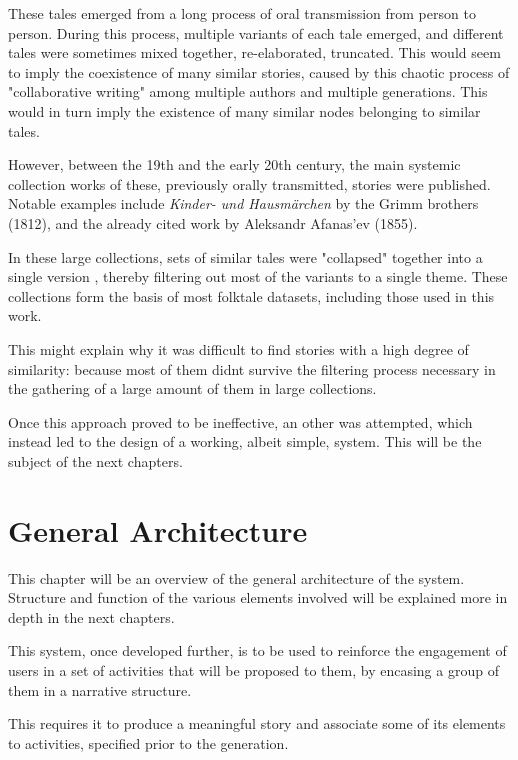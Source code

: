 \documentclass[12pt,a4paper,oneside]{report}
\begin{document}
\begin{itemize}
These tales emerged from a long process of oral transmission from person to person. During this process, multiple variants of each tale emerged, and different tales were sometimes mixed together, re-elaborated, truncated. This would seem to imply the coexistence of many similar stories, caused by this chaotic process of "collaborative writing" among multiple authors and multiple generations. This would in turn imply the existence of many similar nodes belonging to similar tales.

However, between the 19th and the early 20th century, the main systemic collection works of these, previously orally transmitted, stories were published. Notable examples include \textit{Kinder- und Hausmärchen} by the Grimm brothers (1812), and the already cited work by Aleksandr Afanas'ev (1855).

In these large collections, sets of similar tales were "collapsed" together into a single version \cite{propp}, thereby filtering out most of the variants to a single theme. These collections form the basis of most folktale datasets, including those used in this work. 

\bigskip

This might explain why it was difficult to find stories with a high degree of similarity: because most of them didnt survive the filtering process necessary in the gathering of a large amount of them in large collections.
\end{itemize}

\bigskip

Once this approach proved to be ineffective, an other was attempted, which instead led to the design of a working, albeit simple, system. This will be the subject of the next chapters.

\pagebreak

\chapter{General Architecture}
This chapter will be an overview of the general architecture of the system. Structure and function of the various elements involved will be explained more in depth in the next chapters. 

\bigskip

This system, once developed further, is to be used to reinforce the engagement of users in a set of activities that will be proposed to them, by encasing a group of them in a narrative structure.

This requires it to produce a meaningful story and associate some of its elements to activities, specified prior to the generation.
\end{document}
